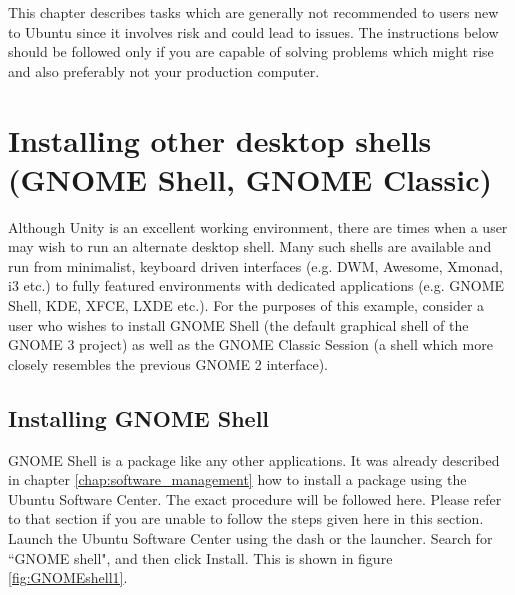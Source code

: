 This chapter describes tasks which are generally not recommended to users new to Ubuntu since it involves risk and could lead to issues. The instructions below should be followed only if you are capable of solving problems which might rise and also preferably not your production computer.


\section{Installing other desktop shells (GNOME Shell, GNOME Classic)} 
Although Unity is an excellent working environment, there are times when a user may wish to run an alternate desktop shell. Many such shells are available and run from minimalist, keyboard driven interfaces (e.g. DWM, Awesome, Xmonad, i3 etc.) to fully featured environments with dedicated applications (e.g. GNOME Shell, KDE, XFCE, LXDE etc.).    For the purposes of this example, consider a user who wishes to install GNOME Shell (the default graphical shell of the GNOME 3 project) as well as the GNOME Classic Session (a shell which more closely resembles the previous GNOME 2 interface). \\

\subsection*{Installing GNOME Shell}
GNOME Shell is a package like any other applications. It was already described in chapter \ref{chap:software_management} how to install a package using the Ubuntu Software Center. The exact procedure will be followed here. Please refer to that section if you are unable to follow the steps given here in this section. Launch the Ubuntu Software Center using the dash or the launcher. Search for ``GNOME shell",  and then click Install. This is shown in figure \ref{fig:GNOMEshell1}.


